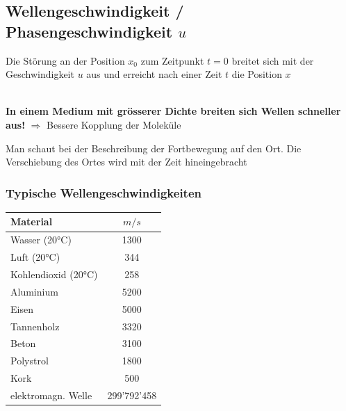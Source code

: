 \subsection{Wellengeschwindigkeit / Phasengeschwindigkeit $u$}
Die Störung an der Position $x_0$ zum Zeitpunkt $t=0$ breitet sich mit der Geschwindigkeit $u$ aus und erreicht nach einer Zeit $t$ die Position $x$ \\

 \\

\raggedright
\textbf{In einem Medium mit grösserer Dichte breiten sich Wellen schneller aus!} $\Rightarrow$ Bessere Kopplung der Moleküle \\
\vspace{0.5cm}

Man schaut bei der Beschreibung der Fortbewegung auf den Ort. Die Verschiebung des Ortes wird mit der Zeit hineingebracht

\subsubsection{Typische Wellengeschwindigkeiten}
\begin{tabular}{| l | c |}
	\hline
	\textbf{Material}   & \textbf{$m/s$} \\ \hline
	Wasser (20°C)       & 1300 \\ \hline
	Luft (20°C)         & 344 \\ \hline
	Kohlendioxid (20°C) & 258 \\ \hline
	Aluminium           & 5200 \\ \hline
	Eisen               & 5000 \\ \hline
	Tannenholz          & 3320 \\ \hline
	Beton               & 3100 \\ \hline
	Polystrol           & 1800 \\ \hline
	Kork                & 500 \\ \hline
	elektromagn. Welle  & 299'792'458 \\ \hline
\end{tabular}

